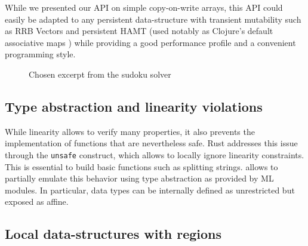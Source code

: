 While we presented our API on simple copy-on-write arrays, this API
could easily be adapted to any persistent data-structure with
transient mutability such as RRB Vectors \cite{DBLP:journals/pacmpl/Puente17}
and persistent HAMT (used notably as Clojure's default associative maps
\cite{bagwell2001ideal,clojurehamt}) while providing a good performance profile
and a convenient programming style.

\begin{figure}
  \centering
  \begin{minipage}[t]{0.45\linewidth}
    
  \end{minipage}\hfill
  \begin{minipage}[t]{0.54\linewidth}
    
  \end{minipage}
  \caption{Chosen excerpt from the sudoku solver}
  \label{ex:sudoku}
\end{figure}

\subsection{Type abstraction and linearity violations}

While linearity allows to verify many properties, it also prevents
the implementation of functions that are nevertheless safe. Rust addresses this
issue through the \lstinline/unsafe/ construct, which allows to locally
ignore linearity constraints. This is essential to build basic
functions such as splitting strings.
%
\lang allows to partially emulate this behavior using type abstraction
as provided by ML modules.
In particular, data types can be internally defined as unrestricted but exposed
as affine.


\subsection{Local data-structures with regions}


